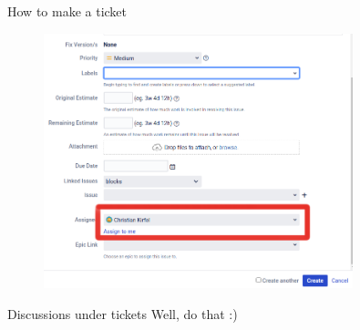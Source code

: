 \documentclass{beamer}
\begin{document}
\begin{frame}{How to make a ticket}
\begin{figure}
  \includegraphics[width=0.8\textwidth]{ticket2.png}
\end{figure}
\end{frame}

\begin{frame}{Discussions under tickets}
    Well, do that :)
\end{frame}
%
%
%
%
\end{document}
